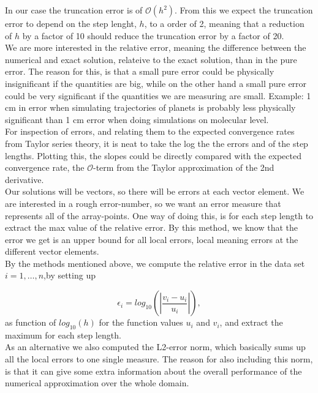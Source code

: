 \documentclass{article}
\begin{document}
In our case the truncation error is of $\mathcal{O}(h^2)$. From this we expect the truncation error to depend on the step lenght, $h$, to a order of 2, meaning that a reduction of $h$ by a factor of 10 should reduce the truncation error by a factor of 20.\\

We are more interested in the relative error, meaning the difference between the numerical and exact solution, relateive to the exact solution, than in the pure error. The reason for this, is that a small pure error could be physically insignificant if the quantities are big, while on the other hand a small pure error could be very significant if the quantities we are measuring are small. Example: 1 cm in error when simulating trajectories of planets is probably less physically significant than 1 cm error when doing simulations on molecular level.\\

For inspection of errors, and relating them to the expected convergence rates from Taylor series theory, it is neat to take the log the the errors and of the step lengths. Plotting this, the slopes could be directly compared with the expected convergence rate, the $\mathcal{O}$-term from the Taylor approximation of the 2nd derivative.\\

Our solutions will be vectors, so there will be errors at each vector element. We are interested in a rough error-number, so we want an error measure that represents all of the array-points. One way of doing this, is for each step length to extract the max value of the relative error. By this method, we know that the error we get is an upper bound for all local errors, local meaning errors at the different vector elements.\\

By the methods mentioned above, we compute the relative error in the data set $i=1,\dots, n$,by setting up

\[
\epsilon_i=log_{10}\left(\left|\frac{v_i-u_i}
{u_i}\right|\right),
\]
as function of $log_{10}(h)$ for the function values $u_i$ and $v_i$, and extract the maximum for each step length.\\

As an alternative we also computed the L2-error norm, which basically sums up all the local errors to one single measure. The reason for also including this norm, is that it can give some extra information about the overall performance of the numerical approximation over the whole domain.
\end{document}
